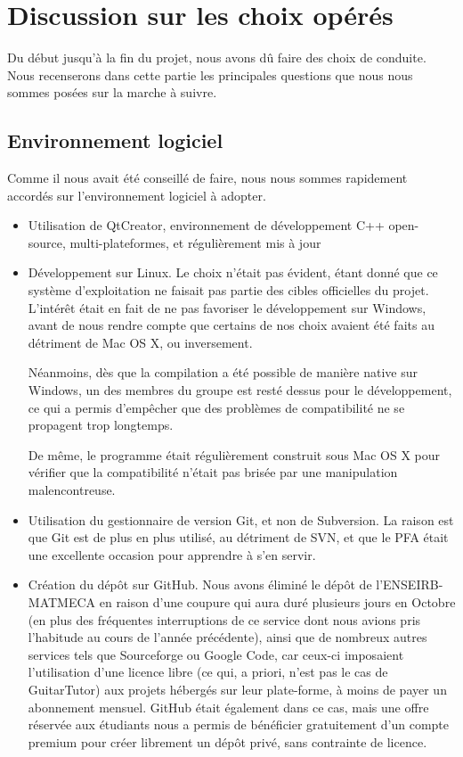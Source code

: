 \section{Discussion sur les choix opérés}

Du début jusqu'à la fin du projet, nous avons dû faire des choix de conduite. Nous recenserons dans cette partie les principales questions que nous nous sommes posées sur la marche à suivre.

\subsection{Environnement logiciel}

Comme il nous avait été conseillé de faire, nous nous sommes rapidement accordés sur l'environnement logiciel à adopter.
\begin{itemize}
 \item Utilisation de QtCreator, environnement de développement C++ open-source, multi-plateformes, et régulièrement mis à jour
 \item Développement sur Linux. Le choix n'était pas évident, étant donné que ce système d'exploitation ne faisait pas partie des cibles officielles du projet. L'intérêt était en fait de ne pas favoriser le développement sur Windows, avant de nous rendre compte que certains de nos choix avaient été faits au détriment de Mac OS X, ou inversement.

 Néanmoins, dès que la compilation a été possible de manière native sur Windows, un des membres du groupe est resté dessus
 pour le développement, ce qui a permis d'empêcher que des problèmes de compatibilité ne se propagent trop longtemps.

 De même, le programme était régulièrement construit sous Mac OS X pour vérifier que la compatibilité n'était pas brisée par une manipulation malencontreuse.
 \item Utilisation du gestionnaire de version Git, et non de Subversion. La raison est que Git est de plus en plus utilisé, au détriment de SVN, et que le PFA était une excellente occasion pour apprendre à s'en servir.
 \item Création du dépôt sur GitHub. Nous avons éliminé le dépôt de l'ENSEIRB-MATMECA en raison d'une coupure qui aura duré plusieurs jours en Octobre (en plus des fréquentes interruptions de ce service dont nous avions pris l'habitude au cours de l'année précédente), ainsi que de nombreux autres services tels que Sourceforge ou Google Code, car ceux-ci imposaient l'utilisation d'une licence libre (ce qui, a priori, n'est pas le cas de GuitarTutor) aux projets hébergés sur leur plate-forme, à moins de payer un abonnement mensuel. GitHub était également dans ce cas, mais une offre réservée aux étudiants nous a permis de bénéficier gratuitement d'un compte premium pour créer librement un dépôt privé, sans contrainte de licence.
\end{itemize}

